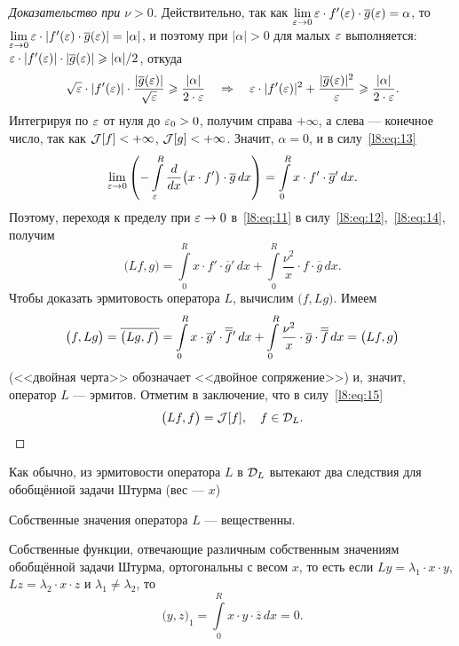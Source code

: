 \begin{proof}[Доказательство при $\nu>0$]
	Действительно, так как $\lim\limits_{\varepsilon\to0}\varepsilon\cdot f'(\varepsilon)\cdot\overline{g}(\varepsilon)=\alpha$, то $\lim\limits_{\eps\to0}\eps\cdot |f'(\eps)\cdot\overline{g}(\eps)|\?=|\alpha|$, и поэтому при $|\alpha|>0$ для малых $\varepsilon$ выполняется: $\eps\cdot|f'(\eps)|\cdot|\overline{g}(\eps)|\?\geqslant|\alpha|/2$, откуда 
	\begin{equation*}
		\sqrt{\varepsilon}\cdot|f'(\varepsilon)|\cdot\frac{|\overline{g}(\varepsilon)|}{\sqrt{\varepsilon}}\geqslant\frac{|\alpha|}{2\cdot\varepsilon}\quad\Rightarrow\quad\varepsilon\cdot|f'(\varepsilon)|^2+\frac{|\overline{g}(\varepsilon)|^2}{\varepsilon}\geqslant\frac{|\alpha|}{2\cdot\varepsilon}.
	\end{equation*}
	Интегрируя по $\varepsilon$ от нуля до $\varepsilon_0>0${\mb,} получим справа $+\infty$, а слева --- конечное число, так как $\mathcal{J}[f]<+\infty$, $\mathcal{J}[g]<+\infty$. Значит{\mb,} $\alpha=0${\mb,} и в силу~\eqref{l8:eq:13} 
	\begin{equation}\label{l8:eq:14}
		\lim\limits_{\varepsilon\to0}\left(-\int\limits_{\varepsilon}^R\frac{d}{dx}\big(x\cdot f'\big)\cdot\overline{g}\,dx\right)=\int\limits_{0}^{R}x\cdot f'\cdot\overline{g}'\,dx.
	\end{equation}
	Поэтому{\mb,} переходя к пределу при $\varepsilon\to0$ в~\eqref{l8:eq:11} в силу~\eqref{l8:eq:12},~\eqref{l8:eq:14}{\mb,} получим
	\begin{equation}\label{l8:eq:15}
		\big(Lf,g\big)=\int\limits_0^R x\cdot f'\cdot\overline{g}'\,dx+\int\limits_{0}^{R}\frac{\nu^2}{x}\cdot f\cdot\overline{g}\,dx.
	\end{equation}
	Чтобы доказать эрмитовость оператора $L${\mb,} вычислим $\big(f,Lg\big)$. Имеем
	\begin{equation*}
		\big(f,Lg\big)=\overline{\big(Lg,f\big)}=\int\limits_0^R x\cdot \overline{g}'\cdot\overline{\overline{f}}\vphantom{f}'\,dx+\int\limits_{0}^{R}\frac{\nu^2}{x}\cdot \overline{g}\cdot\overline{\overline{f}}\,dx=\big(Lf,g\big)
	\end{equation*}
	(<<двойная черта>> обозначает <<двойное сопряжение>>) и, значит, оператор $L$ --- эрмитов. Отметим в заключение, что в силу~\eqref{l8:eq:15} 
	\begin{equation*}
		\big(Lf,f\big)=\mathcal{J}[f],\quad f\in\mathcal{D}_L.
	\end{equation*} 
\end{proof}

Как обычно{\mb,} из эрмитовости оператора $L$ в $\mathcal{D}_L$ вытекают два следствия для обобщённой задачи Штурма (вес --- $x$) 
\begin{enumerateD}
	\item Собственные значения оператора $L$ --- вещественны.
	\item Собственные функции, отвечающие различным собственным значениям обобщённой задачи Штурма{\mb,} ортогональны с весом $x$, то есть если $Ly=\lambda_1\cdot x\cdot y$, $Lz=\lambda_2\cdot x\cdot z$ и $\lambda_1\neq\lambda_2$, то 
	\begin{equation*}
		\big(y,z\big)_1=\int\limits_0^R x\cdot y\cdot\overline{z}\,dx=0.
	\end{equation*}
\end{enumerateD} 